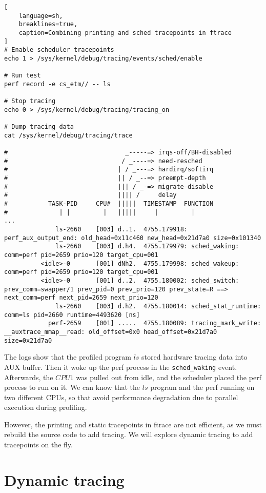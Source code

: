 \documentclass[11pt]{diazessay} %
\def\code#1{\texttt{#1}}
\begin{document}
\begin{lstlisting}[
  	language=sh,
	breaklines=true,
	caption=Combining printing and sched tracepoints in ftrace
]
# Enable scheduler tracepoints
echo 1 > /sys/kernel/debug/tracing/events/sched/enable

# Run test
perf record -e cs_etm// -- ls

# Stop tracing
echo 0 > /sys/kernel/debug/tracing/tracing_on

# Dump tracing data
cat /sys/kernel/debug/tracing/trace

#                                _-----=> irqs-off/BH-disabled
#                               / _----=> need-resched
#                              | / _---=> hardirq/softirq
#                              || / _--=> preempt-depth
#                              ||| / _-=> migrate-disable
#                              |||| /     delay
#           TASK-PID     CPU#  |||||  TIMESTAMP  FUNCTION
#              | |         |   |||||     |         |
...
              ls-2660    [003] d..1.  4755.179918: perf_aux_output_end: old_head=0x11c460 new_head=0x21d7a0 size=0x101340
              ls-2660    [003] d.h4.  4755.179979: sched_waking: comm=perf pid=2659 prio=120 target_cpu=001
          <idle>-0       [001] dNh2.  4755.179998: sched_wakeup: comm=perf pid=2659 prio=120 target_cpu=001
          <idle>-0       [001] d..2.  4755.180002: sched_switch: prev_comm=swapper/1 prev_pid=0 prev_prio=120 prev_state=R ==> next_comm=perf next_pid=2659 next_prio=120
              ls-2660    [003] d.h2.  4755.180014: sched_stat_runtime: comm=ls pid=2660 runtime=4493620 [ns]
            perf-2659    [001] .....  4755.180089: tracing_mark_write: __auxtrace_mmap__read: old_offset=0x0 head_offset=0x21d7a0 size=0x21d7a0
\end{lstlisting}

The logs show that the profiled program \(ls\) stored hardware tracing data
into AUX buffer. Then it woke up the perf process in the \code{sched\_waking}
event. Afterwards, the \(CPU1\) was pulled out from idle, and the scheduler
placed the perf process to run on it. We can know that the \(ls\) program and
the perf running on two different CPUs, so that avoid performance degradation
due to parallel execution during profiling.

However, the printing and static tracepoints in ftrace are not efficient, as
we must rebuild the source code to add tracing. We will explore dynamic
tracing to add tracepoints on the fly.

\section*{Dynamic tracing}
\end{document}
